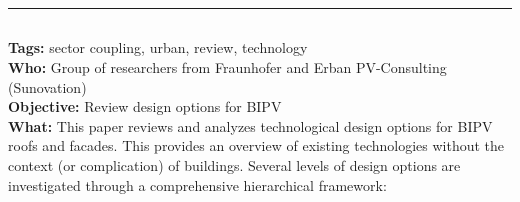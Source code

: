 \documentclass[11pt,a4paper]{article}
\makeatletter
\renewcommand{\maketitle}{\bgroup
   \begin{center}
   \textbf{{\fontsize{18pt}{20}\selectfont \@title}}\\
   \vspace{10pt}
   {\fontsize{12pt}{0}\selectfont \@author} 
   \end{center}
}
\makeatother
\begin{document}

\thispagestyle{fancy}


\noindent\rule{\textwidth}{1pt}
\subsection*{}
\textbf{Tags:} sector coupling, urban, review, technology \\
\textbf{Who:} Group of researchers from Fraunhofer and Erban PV-Consulting (Sunovation) \\
\textbf{Objective:}  Review design options for BIPV \\
\textbf{What:} This paper reviews and analyzes technological design options for BIPV roofs and facades. This provides an overview of existing technologies without the context (or complication) of buildings. Several levels of design options are investigated through a comprehensive hierarchical framework:
\end{document}

